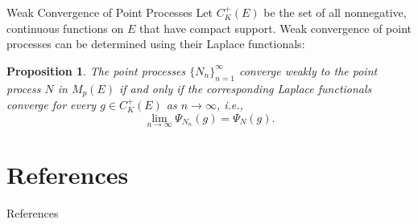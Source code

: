 \documentclass{beamer}
\newtheorem{proposition}{Proposition}
\begin{document}
\begin{frame}{Weak Convergence of Point Processes}
    Let $C_K^+(E)$ be the set of all nonnegative, continuous functions on $E$ that have compact support. Weak convergence of point processes can be determined using their Laplace functionals:
    \begin{proposition}
        The point processes $\{N_n\}_{n = 1}^{\infty}$ converge weakly to the point process $N$ in $M_p(E)$ if and only if the corresponding Laplace functionals converge for every $g \in C_K^+(E)$ as $n \to \infty$, i.e.,
        \[
        \lim_{n \to \infty} \Psi_{N_n}(g) = \Psi_N(g).
        \]
    \end{proposition}
\end{frame}

\section{References}

\begin{frame}[allowframebreaks]{References}
    \nocite{*}
    \printbibliography
\end{frame}
\end{document}
